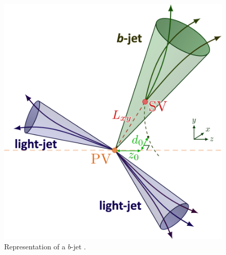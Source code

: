 \begin{figure}[h!]
\center
\begin{minipage}{0.48\textwidth}
  \centering
  \includegraphics[width=\textwidth]{Images/FTAG/intro/jetIm.png}
  \caption{Representation of a $b$-jet \cite{bjetimage}.}
  \label{fig:bjet}
\end{minipage}
\begin{minipage}{0.48\textwidth}
  \centering

\end{minipage}
\end{figure}
